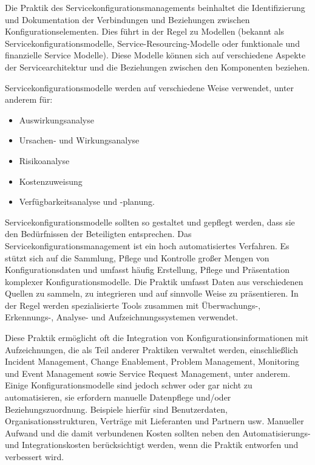 Die Praktik des Servicekonfigurationsmanagements beinhaltet die Identifizierung
und Dokumentation der Verbindungen und Beziehungen zwischen
Konfigurationselementen. Dies führt in der Regel zu Modellen
(bekannt als Servicekonfigurationsmodelle, Service-Resourcing-Modelle oder
funktionale und finanzielle Service Modelle). Diese Modelle können sich auf
verschiedene Aspekte der Servicearchitektur und die Beziehungen zwischen den
Komponenten beziehen. 

Servicekonfigurationsmodelle werden auf verschiedene Weise verwendet, 
unter anderem für:

\begin{itemize}
    \item Auswirkungsanalyse
    \item Ursachen- und Wirkungsanalyse
    \item Risikoanalyse
    \item Kostenzuweisung
    \item Verfügbarkeitsanalyse und -planung.
\end{itemize}

\noindent
Servicekonfigurationsmodelle sollten so gestaltet und gepflegt werden, dass sie
den Bedürfnissen der Beteiligten entsprechen. 
Das Servicekonfigurationsmanagement ist ein hoch automatisiertes Verfahren. Es
stützt sich auf die Sammlung, Pflege und Kontrolle großer Mengen von
Konfigurationsdaten und umfasst häufig Erstellung, Pflege und Präsentation
komplexer Konfigurationsmodelle. Die Praktik umfasst Daten aus verschiedenen
Quellen zu sammeln, zu integrieren und auf sinnvolle Weise zu präsentieren.
In der Regel werden spezialisierte Tools zusammen mit Überwachungs-,
Erkennungs-, Analyse- und Aufzeichnungssystemen verwendet.

Diese Praktik ermöglicht oft die Integration von Konfigurationsinformationen
mit Aufzeichnungen, die als Teil anderer Praktiken verwaltet werden, einschließlich Incident Management, Change Enablement, Problem Management, Monitoring und 
Event Management sowie Service Request Management, unter anderem. 
Einige Konfigurationsmodelle sind jedoch
schwer oder gar nicht zu automatisieren, sie erfordern manuelle Datenpflege
und/oder Beziehungszuordnung. Beispiele hierfür sind Benutzerdaten,
Organisationsstrukturen, Verträge mit Lieferanten und Partnern usw. Manueller
Aufwand und die damit verbundenen Kosten sollten neben den
Automatisierungs- und Integrationskosten berücksichtigt werden, wenn die
Praktik entworfen und verbessert wird.


